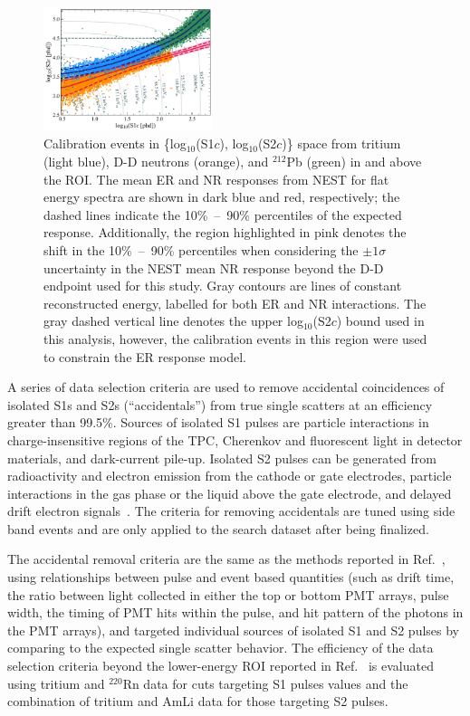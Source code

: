 \documentclass[reprint, showpacs,
preprintnumbers,
amsmath,amssymb,
aps, floatfix,
superscriptaddress,
prd, nofootinbib]{revtex4-1}
\begin{document}
\begin{figure}[ht]
    \centering
    \includegraphics[trim={8 5 5 5},clip, width=0.44\textwidth]{SR1WS_EFT_LogLog}
    \caption{Calibration events in \{log$_{10}$(S1$c$), log$_{10}$(S2$c$)\} space from tritium (light blue), D-D neutrons (orange), and ${}^{212}$Pb (green) in and above the ROI.
    The mean ER and NR responses from NEST for flat energy spectra are shown in dark blue and red, respectively; the dashed lines indicate the 10\%~--~90\% percentiles of the expected response.
    Additionally, the region highlighted in pink denotes the shift in the 10\%~--~90\% percentiles when considering the $\pm1\sigma$ uncertainty in the NEST mean NR response beyond the D-D endpoint used for this study.
    Gray contours are lines of constant reconstructed energy, labelled for both ER and NR interactions. 
    The gray dashed vertical line denotes the upper log$_{10}$(S2$c$) bound used in this analysis, however, the calibration events in this region were used to constrain the ER response model. 
    }
    \label{fig:calibrations}
\end{figure}

\par
A series of data selection criteria are used to remove accidental coincidences of isolated S1s and S2s (``accidentals'') from true single scatters at an efficiency greater than 99.5\%. 
Sources of isolated S1 pulses are particle interactions in charge-insensitive regions of the TPC, Cherenkov and fluorescent light in detector materials, and dark-current pile-up. 
Isolated S2 pulses can be generated from radioactivity and electron emission from the cathode or gate electrodes, particle interactions in the gas phase or the liquid above the gate electrode, and delayed drift electron signals~\cite{LUX:2020vbj}.  
The criteria for removing accidentals are tuned using side band events and are only applied to the search dataset after being finalized. 

The accidental removal criteria are the same as the methods reported in Ref.~\cite{LZ:SR1WS_2022}, using relationships between pulse and event based quantities (such as drift time, the ratio between light collected in either the top or bottom PMT arrays, pulse width, the timing of PMT hits within the pulse, and hit pattern of the photons in the PMT arrays), and targeted individual sources of isolated S1 and S2 pulses by comparing to the expected single scatter behavior.
The efficiency of the data selection criteria beyond the lower-energy ROI reported in Ref.~\cite{LZ:SR1WS_2022} is evaluated using tritium and $^{220}$Rn data for cuts targeting S1 pulses values and the combination of tritium and AmLi data for those targeting S2 pulses. 
\end{document}
